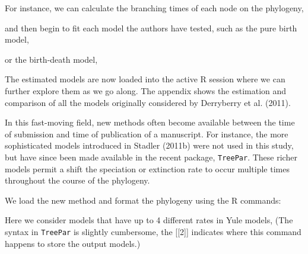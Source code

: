 For instance, we can calculate the branching times of each node on the
phylogeny,

\begin{Shaded}
\begin{Highlighting}[]
\end{Highlighting}
\end{Shaded}
and then begin to fit each model the authors have tested, such as the
pure birth model,

\begin{Shaded}
\begin{Highlighting}[]
\end{Highlighting}
\end{Shaded}
or the birth-death model,

\begin{Shaded}
\begin{Highlighting}[]
\end{Highlighting}
\end{Shaded}
The estimated models are now loaded into the active R session where we
can further explore them as we go along. The appendix shows the
estimation and comparison of all the models originally considered by
Derryberry et al. (2011).

In this fast-moving field, new methods often become available between
the time of submission and time of publication of a manuscript. For
instance, the more sophisticated models introduced in Stadler (2011b)
were not used in this study, but have since been made available in the
recent package, \texttt{TreePar}. These richer models permit a shift the
speciation or extinction rate to occur multiple times throughout the
course of the phylogeny.

We load the new method and format the phylogeny using the R commands:

\begin{Shaded}
\begin{Highlighting}[]
\NormalTok{(} \NormalTok{)}
\end{Highlighting}
\end{Shaded}
Here we consider models that have up to 4 different rates in Yule
models, (The syntax in \texttt{TreePar} is slightly cumbersome, the
{[}{[}2{]}{]} indicates where this command happens to store the output
models.)

